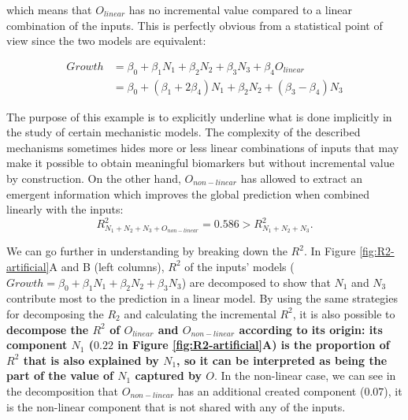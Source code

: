 \documentclass[a4paper,12pt,twoside,onecolumn,openright,final,oldfontcommands]{memoir}
\begin{document}
which means that \(O_{linear}\) has no incremental value compared to a
linear combination of the inputs. This is perfectly obvious from a
statistical point of view since the two models are equivalent:

\begin{equation*}
\begin{aligned}
Growth &=\beta_0+\beta_1 N_1+\beta_2 N_2 + \beta_3 N_3+\beta_4 O_{linear}\\
       &=\beta_0+(\beta_1+2\beta_4) N_1+\beta_2 N_2 + (\beta_3 - \beta_4) N_3
\end{aligned}
\end{equation*}

The purpose of this example is to explicitly underline what is done
implicitly in the study of certain mechanistic models. The complexity of
the described mechanisms sometimes hides more or less linear
combinations of inputs that may make it possible to obtain meaningful
biomarkers but without incremental value by construction. On the other
hand, \(O_{non-linear}\) has allowed to extract an emergent information
which improves the global prediction when combined linearly with the
inputs: \[R^2_{N_1+N_2+N_3+O_{non-linear}}=0.586>R^2_{N_1+N_2+N_3}.\]

We can go further in understanding by breaking down the \(R^2\). In
Figure \ref{fig:R2-artificial}A and B (left columns), \(R^2\) of the
inputs' models
(\(Growth = \beta_0+\beta_1 N_1+\beta_2 N_2 + \beta_3 N_3\)) are
decomposed to show that \(N_1\) and \(N_3\) contribute most to the
prediction in a linear model. By using the same strategies for
decomposing the \(R_2\) and calculating the incremental \(R^2\), it is
also possible to \textbf{decompose the \(R^2\) of \(O_{linear}\) and
\(O_{non-linear}\) according to its origin: its component \(N_1\)
(\(0.22\) in Figure \ref{fig:R2-artificial}A) is the proportion of
\(R^2\) that is also explained by \(N_1\), so it can be interpreted as
being the part of the value of \(N_1\) captured by \(O\)}. In the
non-linear case, we can see in the decomposition that \(O_{non-linear}\)
has an additional created component (\(0.07\)), it is the non-linear
component that is not shared with any of the inputs.
\end{document}
